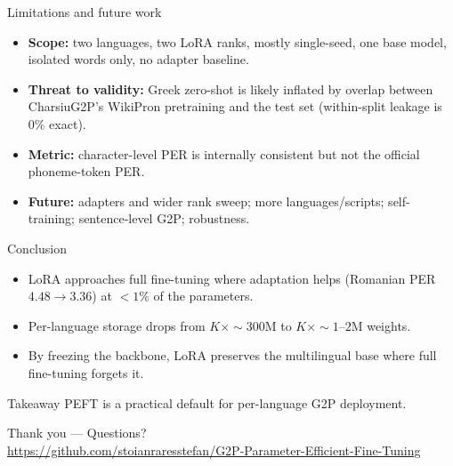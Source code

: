 \documentclass[aspectratio=169]{beamer}
\begin{document}
\begin{frame}{Limitations and future work}
  \begin{itemize}
    \item \textbf{Scope:} two languages, two LoRA ranks, mostly single-seed, one base model, isolated words only, no adapter baseline.
    \item \textbf{Threat to validity:} Greek zero-shot is likely inflated by overlap between CharsiuG2P's WikiPron pretraining and the test set (within-split leakage is 0\% exact).
    \item \textbf{Metric:} character-level PER is internally consistent but not the official phoneme-token PER.
    \item \textbf{Future:} adapters and wider rank sweep; more languages/scripts; self-training; sentence-level G2P; robustness.
  \end{itemize}
\end{frame}

\begin{frame}{Conclusion}
  \begin{itemize}
    \item LoRA \alert{approaches full fine-tuning} where adaptation helps (Romanian PER $4.48\rightarrow3.36$) at \alert{$<1\%$} of the parameters.
    \item Per-language storage drops from $K\times{\sim}300$M to $K\times{\sim}1$--$2$M weights.
    \item By freezing the backbone, LoRA \alert{preserves the multilingual base} where full fine-tuning forgets it.
  \end{itemize}
  \vspace{0.6em}
  \begin{block}{Takeaway}
    \centering PEFT is a practical default for per-language G2P deployment.
  \end{block}
\end{frame}

\begin{frame}[plain]
  \centering
  \vfill
  {\Large Thank you --- Questions?}\\[1em]
  \footnotesize \url{https://github.com/stoianraresstefan/G2P-Parameter-Efficient-Fine-Tuning}
  \vfill
\end{frame}
\end{document}

